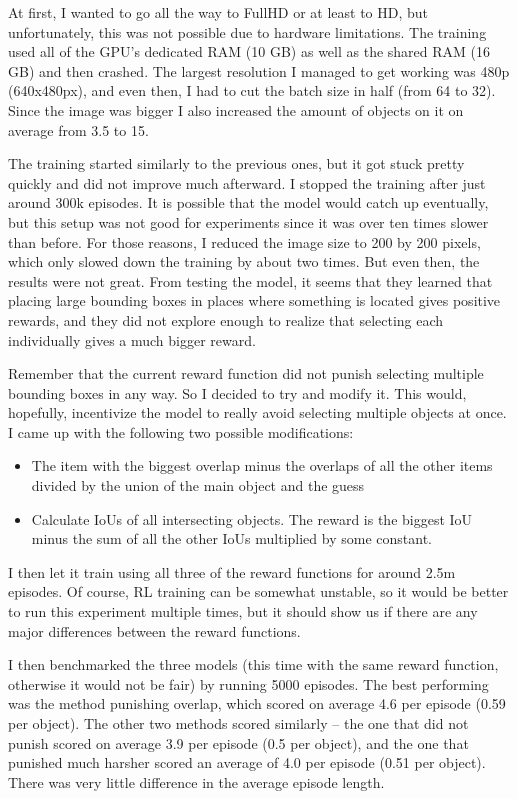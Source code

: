 \documentclass[
  digital,     %
  oneside,     %
  nosansbold,  %
  nocolorbold, %
  lof,         %
  lot,         %
]{fithesis4}
\begin{document}
At first, I wanted to go all the way to FullHD or at least to HD, but unfortunately, this was not possible due to hardware limitations. The training used all of the GPU's dedicated RAM (10 GB) as well as the shared RAM (16 GB) and then crashed. The largest resolution I managed to get working was 480p (640x480px), and even then, I had to cut the batch size in half (from 64 to 32). Since the image was bigger I also increased the amount of objects on it on average from 3.5 to 15.

The training started similarly to the previous ones, but it got stuck pretty quickly and did not improve much afterward. I stopped the training after just around 300k episodes. It is possible that the model would catch up eventually, but this setup was not good for experiments since it was over ten times slower than before. For those reasons, I reduced the image size to 200 by 200 pixels, which only slowed down the training by about two times. But even then, the results were not great. From testing the model, it seems that they learned that placing large bounding boxes in places where something is located gives positive rewards, and they did not explore enough to realize that selecting each individually gives a much bigger reward. 

Remember that the current reward function did not punish selecting multiple bounding boxes in any way. So I decided to try and modify it. This would, hopefully, incentivize the model to really avoid selecting multiple objects at once. I came up with the following two possible modifications:
\begin{itemize}
    \item The item with the biggest overlap minus the overlaps of all the other items divided by the union of the main object and the guess
    \item Calculate IoUs of all intersecting objects. The reward is the biggest IoU minus the sum of all the other IoUs multiplied by some constant.
\end{itemize}

I then let it train using all three of the reward functions for around 2.5m episodes. Of course, RL training can be somewhat unstable, so it would be better to run this experiment multiple times, but it should show us if there are any major differences between the reward functions.

I then benchmarked the three models (this time with the same reward function, otherwise it would not be fair) by running 5000 episodes. The best performing was the method punishing overlap, which scored on average 4.6 per episode (0.59 per object). The other two methods scored similarly -- the one that did not punish scored on average 3.9 per episode (0.5 per object), and the one that punished much harsher scored an average of 4.0 per episode (0.51 per object). There was very little difference in the average episode length.
\end{document}
